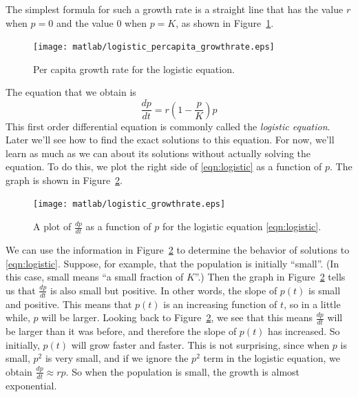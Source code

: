 \documentclass[reqno]{immbook}
\begin{document}
The simplest formula for such a growth rate is a straight line that has
the value $r$ when $p=0$ and the value $0$ when $p=K$, as shown in
Figure~\ref{fig:growthrate}.
\begin{figure}
\centerline{\texttt{[image: matlab/logistic\_percapita\_growthrate.eps]}} 
\caption{Per capita growth rate for the logistic equation.}
\label{fig:growthrate}
\end{figure} 
The equation that we obtain is
\begin{equation}
  \frac{dp}{dt} = r\left(1-\frac{p}{K}\right)p
\label{eqn:logistic}
\end{equation}
This first order differential equation is commonly called the \emph{logistic equation}.
Later we'll see how to find the exact solutions to this equation.
For now, we'll learn as much as we can about its solutions without actually solving the
equation.  To do this, we plot the right side of \eqref{eqn:logistic} as a function of $p$.
The graph is shown in Figure~\ref{fig:logisticrhs}.
\begin{figure}
\centerline{\texttt{[image: matlab/logistic\_growthrate.eps]}} 
\caption{A plot of $\frac{dp}{dt}$ as a function of $p$ for the logistic
equation \eqref{eqn:logistic}.}
\label{fig:logisticrhs}
\end{figure}
We can use the information in Figure~\ref{fig:logisticrhs} to determine the
behavior of solutions to \eqref{eqn:logistic}.
Suppose, for example, that the population is initially ``small''.
(In this case, small means ``a small fraction of $K$''.)
Then the graph in Figure~\ref{fig:logisticrhs} tells us that
$\frac{dp}{dt}$ is also small but positive.  In other words, the slope
of $p(t)$ is small and positive.  This means that $p(t)$ is an increasing
function of $t$, so in a little while, $p$ will be larger.  Looking back to
Figure~\ref{fig:logisticrhs}, we see that this means $\frac{dp}{dt}$ will be
larger than it was before, and therefore the slope of $p(t)$ has increased.
So initially, $p(t)$ will grow faster and faster.  This is not surprising, since
when $p$ is small, $p^2$ is very small, and if we ignore the $p^2$ term in the
logistic equation, we obtain $\frac{dp}{dt} \approx rp$.  So when the
population is small, the growth is almost exponential.
\end{document}
